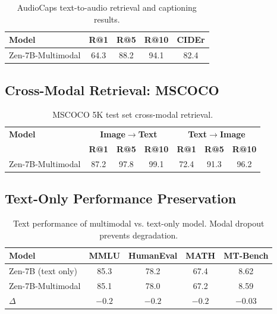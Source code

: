 \documentclass[11pt,a4paper]{article}
\begin{document}
\begin{table}[H]
\centering
\begin{tabular}{lcccc}
\toprule
\textbf{Model} & \textbf{R@1} & \textbf{R@5} & \textbf{R@10} & \textbf{CIDEr} \\
\midrule
Zen-7B-Multimodal & 64.3 & 88.2 & 94.1 & 82.4 \\
\bottomrule
\end{tabular}
\caption{AudioCaps text-to-audio retrieval and captioning results.}
\end{table}

\subsection{Cross-Modal Retrieval: MSCOCO}

\begin{table}[H]
\centering
\begin{tabular}{lcccccc}
\toprule
\textbf{Model} & \multicolumn{3}{c}{\textbf{Image$\to$Text}} & \multicolumn{3}{c}{\textbf{Text$\to$Image}} \\
& \textbf{R@1} & \textbf{R@5} & \textbf{R@10} & \textbf{R@1} & \textbf{R@5} & \textbf{R@10} \\
\midrule
Zen-7B-Multimodal & 87.2 & 97.8 & 99.1 & 72.4 & 91.3 & 96.2 \\
\bottomrule
\end{tabular}
\caption{MSCOCO 5K test set cross-modal retrieval.}
\end{table}

\subsection{Text-Only Performance Preservation}

\begin{table}[H]
\centering
\begin{tabular}{lcccc}
\toprule
\textbf{Model} & \textbf{MMLU} & \textbf{HumanEval} & \textbf{MATH} & \textbf{MT-Bench} \\
\midrule
Zen-7B (text only) & 85.3 & 78.2 & 67.4 & 8.62 \\
Zen-7B-Multimodal & 85.1 & 78.0 & 67.2 & 8.59 \\
$\Delta$ & $-0.2$ & $-0.2$ & $-0.2$ & $-0.03$ \\
\bottomrule
\end{tabular}
\caption{Text performance of multimodal vs. text-only model. Modal dropout prevents degradation.}
\end{table}
\end{document}
